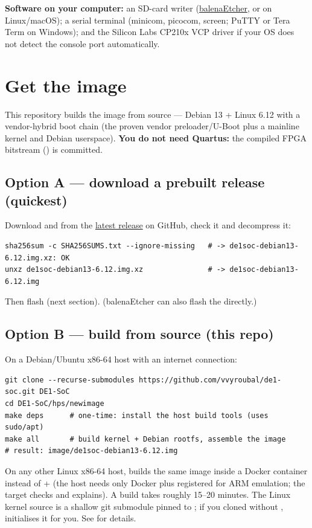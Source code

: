 \noindent\textbf{Software on your computer:} an SD-card writer
(\href{https://etcher.balena.io/}{balenaEtcher}, or  on Linux/macOS); a
serial terminal (minicom, picocom, screen; PuTTY or Tera Term on Windows); and
the Silicon Labs CP210x VCP driver if your OS does not detect the console port
automatically.

\section{Get the image}
This repository builds the image from source --- Debian 13 + Linux 6.12 with a
vendor-hybrid boot chain (the proven vendor preloader/U-Boot plus a mainline
kernel and Debian userspace). \textbf{You do not need Quartus:} the compiled FPGA
bitstream () is committed.

\subsection{Option A --- download a prebuilt release (quickest)}
Download  and  from the
\href{https://github.com/vvyroubal/de1-soc/releases/latest}{latest release} on GitHub, check it and decompress it:
\begin{lstlisting}
sha256sum -c SHA256SUMS.txt --ignore-missing   # -> de1soc-debian13-6.12.img.xz: OK
unxz de1soc-debian13-6.12.img.xz               # -> de1soc-debian13-6.12.img
\end{lstlisting}
Then flash  (next section). (balenaEtcher can also
flash the  directly.)

\subsection{Option B --- build from source (this repo)}
On a Debian/Ubuntu x86-64 host with an internet connection:
\begin{lstlisting}
git clone --recurse-submodules https://github.com/vvyroubal/de1-soc.git DE1-SoC
cd DE1-SoC/hps/newimage
make deps      # one-time: install the host build tools (uses sudo/apt)
make all       # build kernel + Debian rootfs, assemble the image
# result: image/de1soc-debian13-6.12.img
\end{lstlisting}
On any other Linux x86-64 host,  builds the same image
inside a Docker container instead of  +  (the host
needs only Docker plus  registered for ARM emulation; the target
checks and explains). A build takes roughly 15--20 minutes.
The Linux kernel source is a shallow git submodule pinned to ; if you
cloned without ,  initialises it for you.
See  for details.

